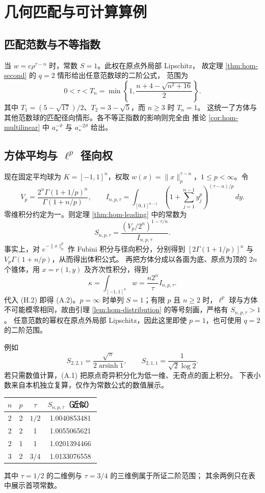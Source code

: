 \section{几何匹配与可计算算例}\label{sec:hom-applications}
\subsection{匹配范数与不等指数}
当 $w=c\rho^{\tau-n}$ 时，常数 $S=1$。此权在原点外局部 Lipschitz，
故定理 \ref{thm:hom-second} 的 $q=2$ 情形给出任意范数球的二阶公式，
范围为
\[0<\tau<T_n=\min\left\{1,\frac{n+4-\sqrt{n^2+16}}2\right\}.\]
其中 $T_1=(5-\sqrt{17})/2$、$T_2=3-\sqrt5$，而 $n\ge3$ 时 $T_n=1$。
这统一了方体与其他范数球的匹配径向情形。各不等正指数的影响则完全由
推论 \ref{cor:hom-multilinear} 中 $a_*^{-\vartheta}$ 与 $a_*^{-2\vartheta}$ 给出。

\subsection{方体平均与 \texorpdfstring{$\ell^p$}{lp} 径向权}
现在固定平均球为 $K=[-1,1]^n$，权取
$w(x)=\|x\|_p^{\tau-n}$，$1\le p<\infty$。令
\[V_p=\frac{2^n\Gamma(1+1/p)^n}{\Gamma(1+n/p)},\qquad
I_{n,p,\tau}=\int_{[0,1]^{n-1}}
\left(1+\sum_{j=1}^{n-1}y_j^p\right)^{(\tau-n)/p}\,dy.\tag{A.1}\]
零维积分约定为一。则定理 \ref{thm:hom-leading} 中的常数为
\[S_{n,p,\tau}
=\frac{(V_p/2^n)^{1-\tau/n}}{I_{n,p,\tau}}.\tag{A.2}\]
事实上，对 $e^{-\|x\|_p^p}$ 作 Fubini 积分与径向积分，分别得到
$[2\Gamma(1+1/p)]^n$ 与 $V_p\Gamma(1+n/p)$，从而得出体积公式。
再把方体分成以各面为底、原点为顶的 $2n$ 个锥体，用
$x=r(1,y)$ 及齐次性积分，得到
\[\kappa=\int_{[-1,1]^n}w
=\frac{n2^n}{\tau}I_{n,p,\tau}.\tag{A.3}\]
代入 (H.2) 即得 (A.2)。$p=\infty$ 时单列 $S=1$；有限 $p$ 且
$n\ge2$ 时，$\ell^p$ 球与方体不可能模零相同，故由引理
\ref{lem:hom-distribution} 的等号刻画，严格有 $S_{n,p,\tau}>1$。
任意范数的幂权在原点外局部 Lipschitz，因此这里即使 $p=1$，也可使用
$q=2$ 的二阶范围。

例如
\[S_{2,2,1}=\frac{\sqrt\pi}{2\operatorname{arsinh}1},\qquad
S_{2,1,1}=\frac1{\sqrt2\log2}.\tag{A.4}\]
若只需数值计算，(A.1) 把原点奇异积分化为低一维、无奇点的面上积分。
下表小数来自本机独立复算，仅作为常数公式的数值展示。
\begin{center}
\begin{tabular}{cccc}
$n$&$p$&$\tau$&$S_{n,p,\tau}$（近似）\\\hline
2&2&$1/2$&1.0040853481\\
2&2&1&1.0055065621\\
2&1&1&1.0201394466\\
3&2&$3/4$&1.0133076558
\end{tabular}
\end{center}
其中 $\tau=1/2$ 的二维例与 $\tau=3/4$ 的三维例属于所证二阶范围；
其余两例只在表中展示首项常数。

